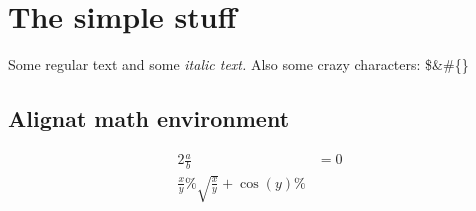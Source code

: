 \documentclass{article}%
\begin{document}
%
\normalsize%
\section*{The simple stuff}%
\label{sec:The simple stuff}%
Some regular text and some%
\textit{italic text. }%
\newline%
Also some crazy characters: \$\&\#\{\}

%
\subsection{Alignat math environment}%
\label{subsec:Alignat math environment}%
\begin{alignat*}{2}%
\frac{a}{b} &= 0 \\%
\frac{x}{y} \%
\sqrt{\frac{x}{y}} + \cos{\left (y \right )} \%
\end{alignat*}

%
\end{document}
